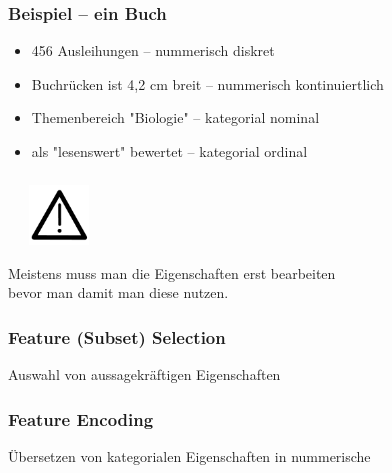 \documentclass[aspectratio=169]{beamer}
\begin{document}
\begin{frame}
  \frametitle{Beispiel -- ein Buch}
  \begin{block}{}
    \begin{itemize}
    \item 456 Ausleihungen -- nummerisch diskret 
    \item Buchrücken ist 4,2 cm breit -- nummerisch kontinuiertlich      
    \item Themenbereich "Biologie"  -- kategorial nominal
    \item als "lesenswert" bewertet -- kategorial ordinal
    \end{itemize}
  \end{block}        
\end{frame}

\begin{frame}
  \frametitle{}
  \begin{block}{}
    \begin{minipage}{0.15\textwidth}
      \ \ \
      \includegraphics[width=1.6cm]{images/kuf_icons_warning_triangle.pdf}
    \end{minipage}
    \hfill
    \begin{minipage}{0.8\textwidth}
       Meistens muss man die Eigenschaften erst bearbeiten\\ bevor man
       damit man diese nutzen.
    \end{minipage}
  \end{block}
\end{frame}

\begin{frame}
  \frametitle{Feature (Subset) Selection}
  \begin{block}{}
    \begin{center}
      Auswahl von aussagekräftigen Eigenschaften
    \end{center}  
  \end{block}
\end{frame}  

\begin{frame}
  \frametitle{Feature Encoding}
  \begin{block}{}
    \begin{center}
      Übersetzen von kategorialen Eigenschaften in nummerische
    \end{center}
  \end{block}
\end{frame}
\end{document}
